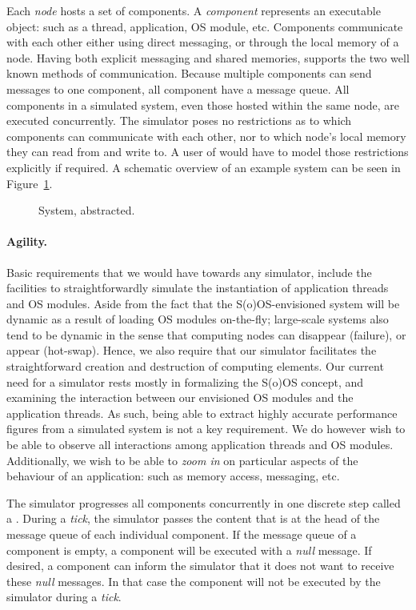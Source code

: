Each \emph{node} hosts a set of components.  A \emph{component}
represents an executable object: such as a thread, application, OS
module, etc.  Components communicate with each other either using
direct messaging, or through the local memory of a node.  Having both
explicit messaging and shared memories, \soosim supports the two well
known methods of communication.  Because multiple components can send
messages to one component, all component have a message queue.  All
components in a simulated system, even those hosted within the same
node, are executed concurrently.  The simulator poses no restrictions
as to which components can communicate with each other, nor to which
node's local memory they can read from and write to.  A user of
\soosim would have to model those restrictions explicitly if required.
A schematic overview of an example system can be seen in
Figure~\ref{fig:system}.

\def\svgwidth{\columnwidth}
\begin{figure}
%
\caption{System, abstracted.}
\label{fig:system}
\end{figure}

\paragraph{Agility.} Basic requirements that we would have towards
any simulator, include the facilities to straightforwardly simulate
the instantiation of application threads and OS modules.  Aside from
the fact that the S(o)OS-envisioned system will be dynamic as a result
of loading OS modules on-the-fly; large-scale systems also tend to be
dynamic in the sense that computing nodes can disappear (failure), or
appear (hot-swap).  Hence, we also require that our simulator
facilitates the straightforward creation and destruction of computing
elements.  Our current need for a simulator rests mostly in
formalizing the S(o)OS concept, and examining the interaction between
our envisioned OS modules and the application threads.  As such, being
able to extract highly accurate performance figures from a simulated
system is not a key requirement.  We do however wish to be able to
observe all interactions among application threads and OS modules.
Additionally, we wish to be able to \emph{zoom in} on particular
aspects of the behaviour of an application: such as memory access,
messaging, etc.

The simulator progresses all components concurrently in one discrete
step called a .  During a \emph{tick}, the simulator passes
the content that is at the head of the message queue of each
individual component.  If the message queue of a component is empty, a
component will be executed with a \emph{null} message.  If desired, a
component can inform the simulator that it does not want to receive
these \emph{null} messages.  In that case the component will not be
executed by the simulator during a \emph{tick}.


